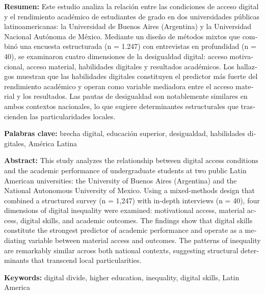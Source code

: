 \begin{tcolorbox}[colback=brown!8!white,colframe=brown!8!white,boxrule=0pt,arc=2pt,left=4pt,right=4pt,top=3pt,bottom=3pt,before skip=4pt,after skip=4pt]
\begin{otherlanguage}{spanish}
\sffamily\small \textbf{Resumen:} Este estudio analiza la relación entre las condiciones de acceso digital y el rendimiento académico de estudiantes de grado en dos universidades públicas latinoamericanas: la Universidad de Buenos Aires (Argentina) y la Universidad Nacional Autónoma de México. Mediante un diseño de métodos mixtos que combinó una encuesta estructurada (n = 1.247) con entrevistas en profundidad (n = 40), se examinaron cuatro dimensiones de la desigualdad digital: acceso motivacional, acceso material, habilidades digitales y resultados académicos. Los hallazgos muestran que las habilidades digitales constituyen el predictor más fuerte del rendimiento académico y operan como variable mediadora entre el acceso material y los resultados. Las pautas de desigualdad son notablemente similares en ambos contextos nacionales, lo que sugiere determinantes estructurales que trascienden las particularidades locales.
\par\smallskip\noindent\textbf{Palabras clave:} brecha digital, educación superior, desigualdad, habilidades digitales, América Latina
\end{otherlanguage}
\end{tcolorbox}

\begin{tcolorbox}[colback=brown!8!white,colframe=brown!8!white,boxrule=0pt,arc=2pt,left=4pt,right=4pt,top=3pt,bottom=3pt,before skip=4pt,after skip=4pt]
\begin{otherlanguage}{english}
\sffamily\small \textbf{Abstract:} This study analyzes the relationship between digital access conditions and the academic performance of undergraduate students at two public Latin American universities: the University of Buenos Aires (Argentina) and the National Autonomous University of Mexico. Using a mixed-methods design that combined a structured survey (n = 1,247) with in-depth interviews (n = 40), four dimensions of digital inequality were examined: motivational access, material access, digital skills, and academic outcomes. The findings show that digital skills constitute the strongest predictor of academic performance and operate as a mediating variable between material access and outcomes. The patterns of inequality are remarkably similar across both national contexts, suggesting structural determinants that transcend local particularities.
\par\smallskip\noindent\textbf{Keywords:} digital divide, higher education, inequality, digital skills, Latin America
\end{otherlanguage}
\end{tcolorbox}

